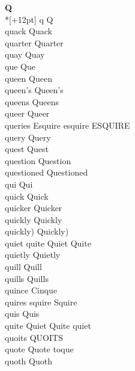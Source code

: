 \vspace{14pt}
\noindent\textbf{\Large Q}\\*[+12pt]
q Q\\
quack Quack\\
quarter Quarter\\
quay Quay\\
que Que\\
queen Queen\\
queen's Queen's\\
queens Queens\\
queer Queer\\
queries Esquire esquire ESQUIRE\\
query Query\\
quest Quest\\
question Question\\
questioned Questioned\\
qui Qui\\
quick Quick\\
quicker Quicker\\
quickly Quickly\\
quickly) Quickly)\\
quiet quite Quiet Quite\\
quietly Quietly\\
quill Quill\\
quills Quills\\
quince Cinque\\
quires squire Squire\\
quis Quis\\
quite Quiet Quite quiet\\
quoits QUOITS\\
quote Quote toque\\
quoth Quoth\\

